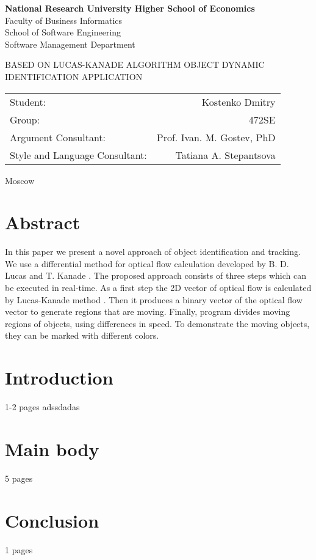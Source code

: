 \documentclass[12pt,a4paper,oneside,titlepage]{article}
\author{Kostenko}
\begin{document}
{
\thispagestyle{empty}
\newpage
\centering

\textbf{
National Research University Higher School of Economics\\
}
Faculty of Business Informatics\\
School of Software Engineering\\
Software Management Department

\vfill


\begin{large}
\MakeTextUppercase{
Based on Lucas-Kanade algorithm Object dynamic identification application
}
\end{large}


\vfill

\begin{tabular}{lr}
Student: & Kostenko Dmitry \\
Group: & 472SE \\
Argument Consultant: & Prof. Ivan. M. Gostev, PhD \\
Style and Language Consultant: & Tatiana A. Stepantsova
\end{tabular}

\vspace{\fill}

Moscow\\ \number\year
\clearpage
}


\section*{Abstract}
{
In this paper we present a novel approach of object identification and tracking.
We use a differential method for optical flow calculation developed by B. D. Lucas and T. Kanade \cite{lucasKanade}.
The proposed approach consists of three steps which can be executed in real-time.
As a first step the 2D vector of optical flow is calculated by Lucas-Kanade method \cite{lucasKanade}.
Then it produces a binary vector of the optical flow vector to generate regions that are moving.  
Finally, program divides moving regions of objects, using differences in speed.
To demonstrate the moving objects, they can be marked with different colors.
}


{
\newpage
\centering
\tableofcontents
}


\newpage
\section*{Introduction}
1-2 pages
adssdadas


\newpage
\section*{Main body}
5 pages

\newpage
\section*{Conclusion}
1 pages
%


\newpage
\renewcommand\refname{Bibliography}


\end{document}
